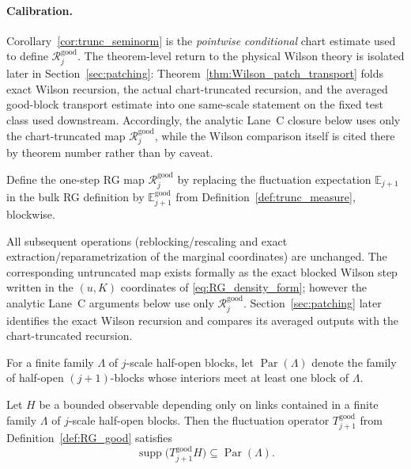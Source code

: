 \paragraph{Calibration.}
Corollary~\ref{cor:trunc_seminorm} is the \emph{pointwise conditional} chart estimate used to define $\mathcal R_j^{\mathrm{good}}$.
The theorem-level return to the physical Wilson theory is isolated later in Section~\ref{sec:patching}: Theorem~\ref{thm:Wilson_patch_transport} folds exact Wilson recursion, the actual chart-truncated recursion, and the averaged good-block transport estimate into one same-scale statement on the fixed test class used downstream.
Accordingly, the analytic Lane~C closure below uses only the chart-truncated map $\mathcal R_j^{\mathrm{good}}$, while the Wilson comparison itself is cited there by theorem number rather than by caveat.

\begin{definition}\label{def:RG_good}
Define the one-step RG map $\mathcal R_j^{\mathrm{good}}$ by replacing the fluctuation expectation $\mathbb E_{j+1}$ in the bulk RG definition by
$\mathbb E_{j+1}^{\mathrm{good}}$ from Definition~\ref{def:trunc_measure}, blockwise.

All subsequent operations (reblocking/rescaling and exact extraction/reparametrization of the marginal coordinates) are unchanged.
The corresponding untruncated map exists formally as the exact blocked Wilson step written in the $(u,K)$ coordinates of \eqref{eq:RG_density_form};
however the analytic Lane~C arguments below use only $\mathcal R_j^{\mathrm{good}}$.
Section~\ref{sec:patching} later identifies the exact Wilson recursion and compares its averaged outputs with the chart-truncated recursion.
\end{definition}

For a finite family $\Lambda$ of $j$-scale half-open blocks, let $\operatorname{Par}(\Lambda)$ denote the family of half-open $(j+1)$-blocks whose interiors meet at least one block of $\Lambda$.

\begin{lemma}\label{lem:RGgood_support_T}
Let $H$ be a bounded observable depending only on links contained in a finite family $\Lambda$ of $j$-scale half-open blocks.
Then the fluctuation operator $T_{j+1}^{\mathrm{good}}$ from Definition~\ref{def:RG_good} satisfies
\[
\operatorname{supp}\bigl(T_{j+1}^{\mathrm{good}}H\bigr)\subseteq \operatorname{Par}(\Lambda).
\]
\end{lemma}

